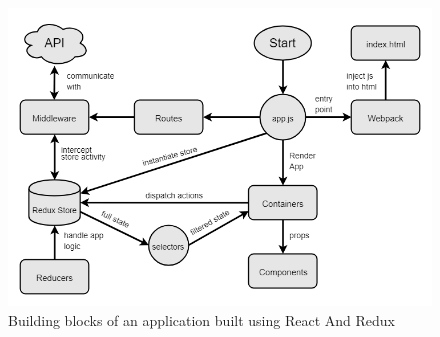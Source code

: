 \begin{figure}[htpb]
  \centering
  \includegraphics[width=\textwidth]{./Figures/system_implementation/react_redux_app.png}
  \caption{Building blocks of an application built using React And Redux}
  \label{fig:react_redux_app}  
\end{figure}




